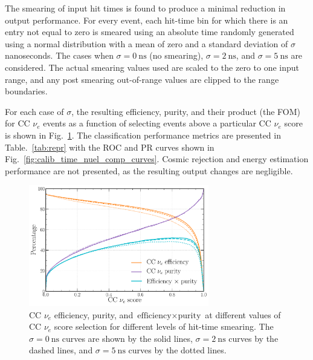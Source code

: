 The smearing of input hit times is found to produce a minimal reduction in output performance. For
every event, each hit-time bin for which there is an entry not equal to zero is smeared using an
absolute time randomly generated using a normal distribution with a mean of zero and a standard
deviation of $\sigma$ nanoseconds. The cases when $\sigma=0~\text{ns}$ (no smearing),
$\sigma=2~\text{ns}$, and $\sigma=5~\text{ns}$ are considered. The actual smearing values used are
scaled to the zero to one input range, and any post smearing out-of-range values are clipped to
the range boundaries.

For each case of $\sigma$, the resulting efficiency, purity, and their product (the FOM) for CC
$\nu_{e}$ events as a function of selecting events above a particular CC $\nu_{e}$ score is shown
in Fig.~\ref{fig:calib_time_nuel_eff_curves}. The classification performance metrics are presented
in Table.~\ref{tab:repr} with the ROC and PR curves shown in
Fig.~\ref{fig:calib_time_nuel_comp_curves}. Cosmic rejection and energy estimation performance are
not presented, as the resulting output changes are negligible.

\begin{figure} %
    \includegraphics[width=0.7\textwidth]{diagrams/7-results/calib_time_nuel_eff_curves.pdf}
    \caption[CC $\nu_{e}$ efficiency and purity curves for different levels of hit-time smearing]
    {CC $\nu_{e}$ efficiency, purity, and $\text{efficiency}\times\text{purity}$ at different
        values of CC $\nu_{e}$ score selection for different levels of hit-time smearing. The
        $\sigma=0~\text{ns}$ curves are shown by the solid lines, $\sigma=2~\text{ns}$ curves by
        the dashed lines, and $\sigma=5~\text{ns}$ curves by the dotted lines.}
    \label{fig:calib_time_nuel_eff_curves}
\end{figure}

